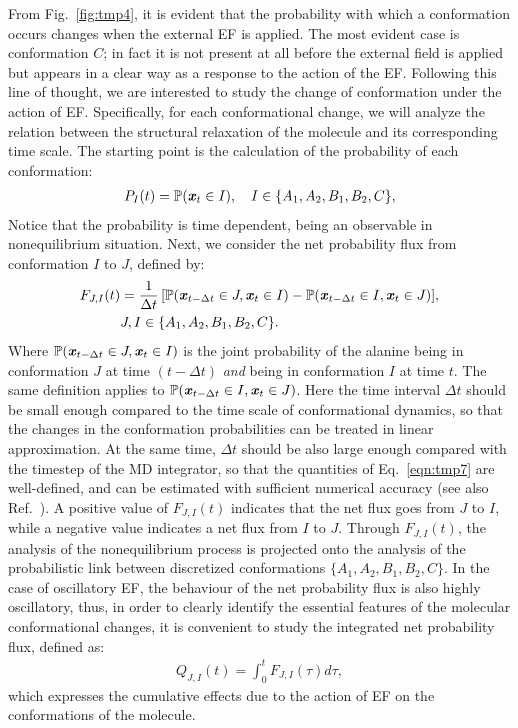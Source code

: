 \documentclass[a4paper,preprint,unsortedaddress,onecolumn]{revtex4-1}
\newcommand{\recheck}[1]{{\color{red} #1}}
\newcommand{\vect}[1]{\textbf{\textit{#1}}}
\begin{document}
\recheck{From Fig.~\ref{fig:tmp4}, it is evident that the probability with which a
conformation occurs changes when the external EF is applied.
The most evident case is conformation $C$; in fact it is not present at all before the external field is applied but appears in a clear way as a response to the action of the EF. Following this line of thought, we are interested to study the change of conformation under the action of EF. Specifically, for each conformational change, we will analyze the relation between the structural relaxation of the molecule and its corresponding time scale. 
The starting point is the calculation of the probability
of each conformation}:
\begin{align}
  P_I(t) = \mathbb P (\vect x_t \in I), \quad  I \in \{A_1, A_2, B_1, B_2, C\},
\end{align}
Notice that the probability is time dependent, being an observable in nonequilibrium situation.
Next,
we consider the net probability flux from conformation $I$ to $J$, defined by:
\begin{align}\nonumber
  F_{J,I}(t) & = \frac1{\Delta t}\, [\mathbb P( \vect x_{t-\Delta t} \in J, \vect x_t \in I) - \mathbb P( \vect x_{t-\Delta t} \in I, \vect x_t \in J)], \\\label{eqn:tmp7}
  & J,I \in \{A_1, A_2, B_1, B_2, C\}.
\end{align}
\recheck{Where $\mathbb P( \vect x_{t-\Delta t} \in J, \vect x_t \in I)$
is the joint probability of the alanine being in conformation $J$ at
time $(t-\Delta t)$ \emph{and} being in conformation $I$ at time $t$.
The same definition applies to $\mathbb P( \vect x_{t-\Delta t} \in I, \vect x_t \in J)$.}
Here the time interval $\Delta t$ should be small enough compared to the
time scale of conformational dynamics,
so that the changes in the conformation probabilities
can be treated in linear approximation.
At the same time,  $\Delta t$ should be also large enough compared with
the timestep of the MD integrator, 
so that the quantities of Eq.~\eqref{eqn:tmp7} are well-defined, and can be
estimated with sufficient numerical accuracy (see also Ref.~\cite{schuette2011markov}).
A positive value \recheck{of $F_{J,I}(t)$} indicates that the
net flux goes from $J$ to $I$,
while a negative value indicates a net flux from $I$ to $J$.
Through $F_{J,I}(t)$, the analysis of the nonequilibrium process 
is projected onto the analysis of the probabilistic link between discretized conformations $\{A_1, A_2, B_1, B_2, C\}$.
\recheck{In the case of oscillatory EF, the behaviour of the net probability flux is also highly oscillatory, thus, in order to clearly identify the essential features of the molecular conformational changes, it is convenient to study the integrated net probability flux, defined as:
\begin{align}\label{eqn:tmp7a}
  Q_{J,I} (t) = \int_0^t F_{J,I}(\tau)d \tau,
\end{align}
which expresses the cumulative effects due to the action of EF on the conformations of the molecule.}
\end{document}
